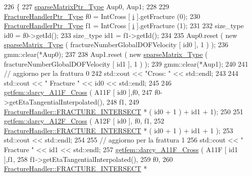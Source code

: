 \begin{DoxyCode}
226     \{
227         \hyperlink{Core_8h_a87137a9501b38c724ac80bc955164bb7}{sparseMatrixPtr\_Type} Aup0, Aup1;
228             
229         \hyperlink{FractureHandler_8h_af23fb7a30aaff864bd42587af4f1e78a}{FractureHandlerPtr\_Type} f0 = IntCross [ \hyperlink{matrici_8m_a6f6ccfcf58b31cb6412107d9d5281426}{i} ].getFracture (0);
230         \hyperlink{FractureHandler_8h_af23fb7a30aaff864bd42587af4f1e78a}{FractureHandlerPtr\_Type} f1 = IntCross [ \hyperlink{matrici_8m_a6f6ccfcf58b31cb6412107d9d5281426}{i} ].getFracture (1);
231         
232         size\_type id0 = f0->getId();
233         size\_type id1 = f1->getId();
234         
235         Aup0.reset ( \textcolor{keyword}{new} \hyperlink{Core_8h_afba9f623673e2ae32054015bdb5500f9}{sparseMatrix\_Type} ( fractureNumberGlobalDOFVelocity [ id0 ], 1 ) 
      );
236         gmm::clear(*Aup0);
237 
238         Aup1.reset ( \textcolor{keyword}{new} \hyperlink{Core_8h_afba9f623673e2ae32054015bdb5500f9}{sparseMatrix\_Type} ( fractureNumberGlobalDOFVelocity [ id1 ], 1 ) 
      );
239         gmm::clear(*Aup1);
240 
241         \textcolor{comment}{// aggiorno per la frattura 0}
242         std::cout << \textcolor{stringliteral}{"Cross: "} << std::endl;
243         
244         std::cout << \textcolor{stringliteral}{" Fracture "} << id0 << std::endl;
245         
246         \hyperlink{namespacegetfem_a9b6ded8fe1019aa04e66d2047d0f29dd}{getfem::darcy\_A11F\_Cross} ( A11F [ id0 ],f0,
247                                    f0->getEtaTangentialInterpolated(), 
248                                    f1,
249                                    \hyperlink{classFractureHandler_a495ad4fc72d0c47c8f0424842f1153aaa781cae3f3b99bf9357fed2833d315537}{FractureHandler::FRACTURE\_INTERSECT} *
       ( id0 + 1 ) + id1 + 1);
250 
251         \hyperlink{namespacegetfem_a88df6c0cb0765d5ab0fae27679cd30f4}{getfem::darcy\_A12F\_Cross} ( A12F [ id0 ], f0, f1,
252                                    \hyperlink{classFractureHandler_a495ad4fc72d0c47c8f0424842f1153aaa781cae3f3b99bf9357fed2833d315537}{FractureHandler::FRACTURE\_INTERSECT} *
       ( id0 + 1 ) + id1 + 1 );
253         std::cout << std::endl;
254         
255         \textcolor{comment}{// aggiorno per la frattura 1}
256         std::cout << \textcolor{stringliteral}{" Fracture "} << id1 << std::endl;
257         \hyperlink{namespacegetfem_a9b6ded8fe1019aa04e66d2047d0f29dd}{getfem::darcy\_A11F\_Cross} ( A11F [ id1 ],f1,
258                                    f1->getEtaTangentialInterpolated(),
259                                    f0,
260                                    \hyperlink{classFractureHandler_a495ad4fc72d0c47c8f0424842f1153aaa781cae3f3b99bf9357fed2833d315537}{FractureHandler::FRACTURE\_INTERSECT} *

\end{DoxyCode}
